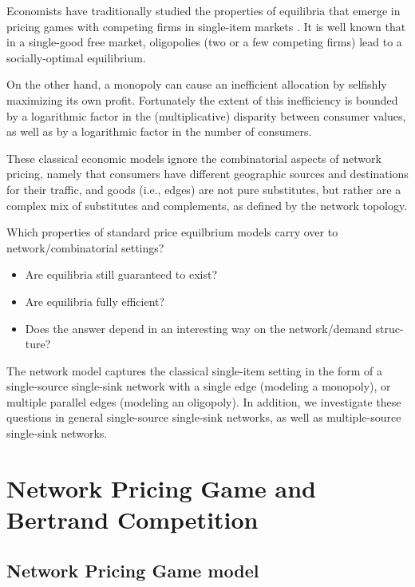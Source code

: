 \documentclass{beamer}
\begin{document}
\begin{frame}
Economists have traditionally studied the properties of equilibria that emerge
in pricing games with competing firms in single-item markets . It is well known that in a single-good free
market, oligopolies (two or a few competing firms) lead to a socially-optimal
equilibrium.

On the other hand, a monopoly can cause an inefficient allocation
by selfishly maximizing its own profit. Fortunately the extent of this inefficiency
is bounded by a logarithmic factor in the (multiplicative) disparity between
consumer values, as well as by a logarithmic factor in the number of consumers.

These classical economic models ignore the combinatorial aspects of network
pricing, namely that consumers have different geographic sources and destinations for their traffic, and goods (i.e., edges) are not pure substitutes, but rather
are a complex mix of substitutes and complements, as defined by the network
topology.
\end{frame}


\begin{frame}
Which properties of standard price equilbrium models carry over to network/combinatorial settings?
\begin{itemize}
\item Are equilibria still guaranteed to exist? 
\item Are equilibria fully efficient?
\item Does the answer depend in an interesting way on the network/demand struc-
ture?
\end{itemize}

The network model captures the classical single-item setting in the form of
a single-source single-sink network with a single edge (modeling a monopoly), or
multiple parallel edges (modeling an oligopoly). In addition, we investigate these
questions in general single-source single-sink networks, as well as multiple-source
single-sink networks.
\end{frame}



\section{Network Pricing Game and Bertrand Competition}

\subsection{Network Pricing Game model}
\end{document}
